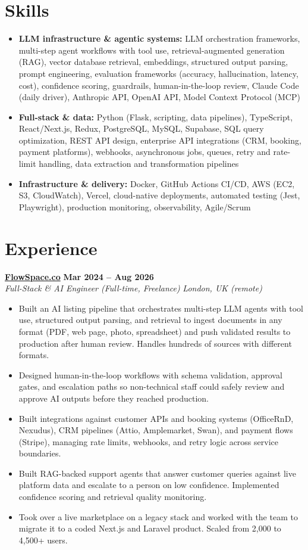 \documentclass[a4paper,10pt]{article}
\newcommand{\role}[4]{%
 \textbf{#1} \hfill \textbf{#2}\\[1pt]%
 \textit{#3} \hfill \textit{#4}\\[2pt]%
}
\begin{document}
\section{Skills}
\begin{itemize}
 \item \textbf{LLM infrastructure \& agentic systems:} LLM orchestration frameworks, multi-step agent workflows with tool use, retrieval-augmented generation (RAG), vector database retrieval, embeddings, structured output parsing, prompt engineering, evaluation frameworks (accuracy, hallucination, latency, cost), confidence scoring, guardrails, human-in-the-loop review, Claude Code (daily driver), Anthropic API, OpenAI API, Model Context Protocol (MCP)
 \item \textbf{Full-stack \& data:} Python (Flask, scripting, data pipelines), TypeScript, React/Next.js, Redux, PostgreSQL, MySQL, Supabase, SQL query optimization, REST API design, enterprise API integrations (CRM, booking, payment platforms), webhooks, asynchronous jobs, queues, retry and rate-limit handling, data extraction and transformation pipelines
 \item \textbf{Infrastructure \& delivery:} Docker, GitHub Actions CI/CD, AWS (EC2, S3, CloudWatch), Vercel, cloud-native deployments, automated testing (Jest, Playwright), production monitoring, observability, Agile/Scrum
\end{itemize}

\section{Experience}

\role{\href{https://flowspace.co}{FlowSpace.co}}{Mar 2024 -- Aug 2026}{Full-Stack \& AI Engineer (Full-time, Freelance)}{London, UK (remote)}
\begin{itemize}
 \item Built an AI listing pipeline that orchestrates multi-step LLM agents with tool use, structured output parsing, and retrieval to ingest documents in any format (PDF, web page, photo, spreadsheet) and push validated results to production after human review. Handles hundreds of sources with different formats.
 \item Designed human-in-the-loop workflows with schema validation, approval gates, and escalation paths so non-technical staff could safely review and approve AI outputs before they reached production.
 \item Built integrations against customer APIs and booking systems (OfficeRnD, Nexudus), CRM pipelines (Attio, Amplemarket, Swan), and payment flows (Stripe), managing rate limits, webhooks, and retry logic across service boundaries.
 \item Built RAG-backed support agents that answer customer queries against live platform data and escalate to a person on low confidence. Implemented confidence scoring and retrieval quality monitoring.
 \item Took over a live marketplace on a legacy stack and worked with the team to migrate it to a coded Next.js and Laravel product. Scaled from 2,000 to 4,500+ users.
\end{itemize}
\end{document}
